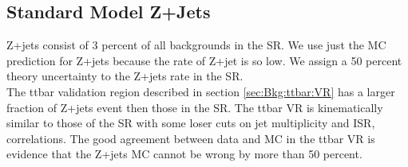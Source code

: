 
\subsection{Standard Model Z+Jets}
\label{sec:Bkg:zjet}

\indent Z+jets consist of 3 percent of all backgrounds in the SR.   We use just the MC prediction for Z+jets because the rate of Z+jet is so low.  We assign a 50 percent theory uncertainty to the Z+jets rate in the SR.  \\


\indent The ttbar validation region described in section \ref{sec:Bkg:ttbar:VR} has a larger fraction of Z+jets event then those in the SR.  The ttbar VR is kinematically similar to those of the SR with some loser cuts on jet multiplicity and ISR, \MET correlations.  The good agreement between data and MC in the ttbar VR is evidence that the Z+jets MC cannot be wrong by more than 50 percent.  \\